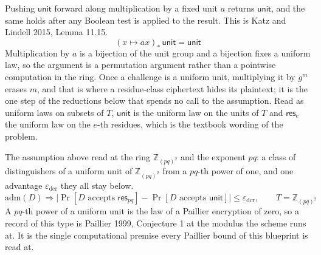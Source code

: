 \begin{lemma}
  \label{lem:unit_fdist_translateE}
  \rocqok
  Pushing $\mathsf{unit}$ forward along multiplication by a fixed unit $a$
  returns $\mathsf{unit}$, and the same holds after any Boolean test is applied
  to the result. This is Katz and Lindell 2015, Lemma 11.15.
  \[ (x \mapsto a x)_{*}\,\mathsf{unit} = \mathsf{unit} \]
  Multiplication by $a$ is a bijection of the unit group and a bijection fixes
  a uniform law, so the argument is a permutation argument rather than a
  pointwise computation in the ring. Once a challenge is a uniform unit,
  multiplying it by $g^m$ erases $m$, and that is where a residue-class
  ciphertext hides its plaintext; it is the one step of the reductions below
  that spends no call to the assumption. Read as uniform laws on subsets of
  $T$, $\mathsf{unit}$ is the uniform law on the units of $T$ and
  $\mathsf{res}_e$ the uniform law on the $e$-th residues, which is the
  textbook wording of the problem.
\end{lemma}

\begin{definition}
  \label{def:dcr_assumption}
  \rocqok
  The assumption above read at the ring $\mathbb{Z}_{(pq)^2}$ and the exponent
  $pq$: a class of distinguishers of a uniform unit of $\mathbb{Z}_{(pq)^2}$
  from a $pq$-th power of one, and one advantage $\varepsilon_{\mathrm{dcr}}$
  they all stay below.
  \[ \mathrm{adm}(D) \Rightarrow \big\lvert
       \Pr[D \text{ accepts } \mathsf{res}_{pq}]
       - \Pr[D \text{ accepts } \mathsf{unit}] \big\rvert
       \le \varepsilon_{\mathrm{dcr}},
     \qquad T = \mathbb{Z}_{(pq)^2} \]
  A $pq$-th power of a uniform unit is the law of a Paillier encryption of
  zero, so a record of this type is Paillier 1999, Conjecture 1 at the modulus
  the scheme runs at. It is the single computational premise every Paillier
  bound of this blueprint is read at.
\end{definition}

